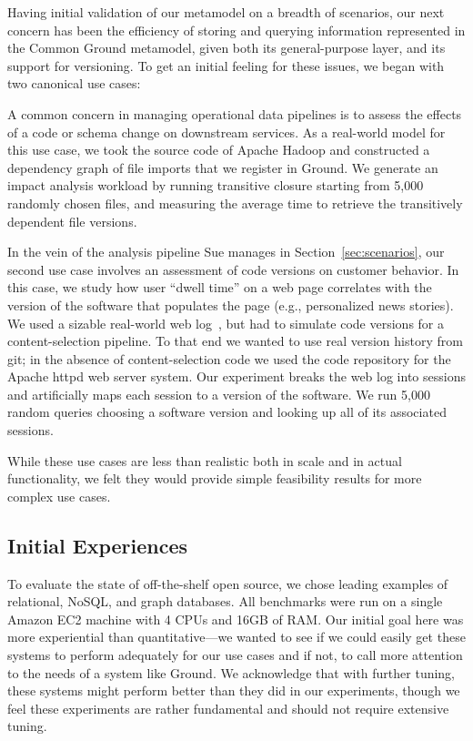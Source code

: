 \documentclass{cidr-2017}
\begin{document}
Having initial validation of our metamodel on a breadth of scenarios, our next concern has been the efficiency of storing and querying information represented in the Common Ground metamodel, given both its general-purpose \modelgraph layer, and its support for versioning. To get an initial feeling for these issues, we began with two canonical use cases:

 A common concern in managing operational data pipelines is to assess the effects of a code or schema change on downstream services.
As a real-world model for this use case, we took the source code of Apache Hadoop and constructed a dependency graph of file imports that we register in Ground.
We generate an impact analysis workload by running transitive closure starting from 5,000 randomly chosen files, and measuring the average time to retrieve the transitively dependent file versions.

 In the vein of the analysis pipeline Sue manages in Section~\ref{sec:scenarios}, our second use case involves an assessment of code versions on customer behavior. 
In this case, we study how user ``dwell time'' on a web page correlates with the version of the software that populates the page (e.g., personalized news stories). 
We used a sizable real-world web log~\cite{starwarskid},
but had to simulate code versions for a content-selection pipeline. 
To that end we wanted to use real version history from git; in the absence of content-selection code we used the code repository for the Apache httpd web server system. 
Our experiment breaks the web log into sessions and artificially maps each session to a version of the software.
We run 5,000 random queries choosing a software version and looking up all of its associated sessions.
\smallitembot

While these use cases are less than realistic both in scale and in actual functionality, we felt they would provide simple feasibility results for more complex use cases.

\subsection{Initial Experiences}
\label{sec:perf}
To evaluate the state of off-the-shelf open source, we chose leading examples of relational, NoSQL, and graph databases.
All benchmarks were run on a single Amazon EC2  machine with 4 CPUs and 16GB of RAM. 
Our initial goal here was more experiential than quantitative---we wanted to see if we could easily get these systems to perform adequately for our use cases and if not, to call more attention to the needs of a system like Ground.
We acknowledge that with further tuning, these systems might perform better than they did in our experiments, though we feel these experiments are rather fundamental and should not require extensive tuning.
\end{document}
